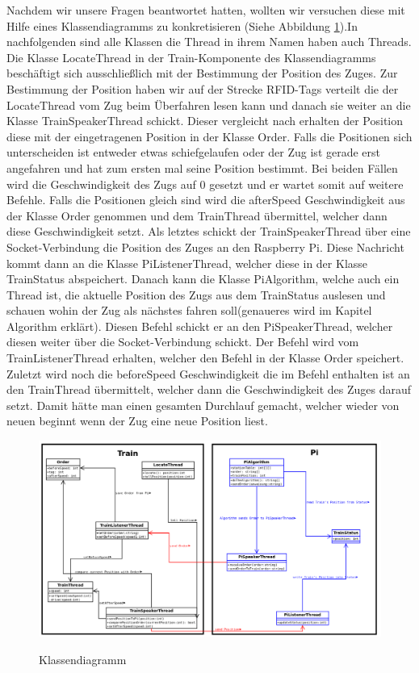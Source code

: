 Nachdem wir unsere Fragen beantwortet hatten, wollten wir versuchen diese mit Hilfe eines Klassendiagramms zu konkretisieren (Siehe Abbildung \ref{pic:ClassDiagram}).In nachfolgenden sind alle Klassen die Thread in ihrem Namen haben auch Threads. Die Klasse LocateThread in der Train-Komponente des Klassendiagramms beschäftigt sich ausschließlich mit der Bestimmung der Position des Zuges. Zur Bestimmung der Position  haben wir auf der Strecke RFID-Tags verteilt die der LocateThread vom Zug beim Überfahren lesen kann und danach sie weiter an die Klasse TrainSpeakerThread schickt. Dieser vergleicht nach erhalten der Position diese mit der eingetragenen Position in der Klasse Order. Falls die Positionen sich unterscheiden ist entweder etwas schiefgelaufen oder der Zug ist gerade erst angefahren und hat zum ersten mal seine Position bestimmt. Bei beiden Fällen wird die Geschwindigkeit des Zugs auf 0 gesetzt und er wartet somit auf weitere Befehle. Falls die Positionen gleich sind wird die afterSpeed Geschwindigkeit aus der Klasse Order genommen und dem TrainThread übermittel, welcher dann diese Geschwindigkeit setzt. Als letztes schickt der TrainSpeakerThread über eine Socket-Verbindung die Position des Zuges an den Raspberry Pi. Diese Nachricht kommt dann an die Klasse PiListenerThread, welcher diese in der Klasse TrainStatus abspeichert. Danach kann die Klasse PiAlgorithm, welche auch ein Thread ist, die aktuelle Position des Zugs aus dem TrainStatus auslesen und schauen wohin der Zug als nächstes fahren soll(genaueres wird im Kapitel Algorithm erklärt). Diesen Befehl schickt er an den PiSpeakerThread, welcher diesen weiter über die Socket-Verbindung schickt. Der Befehl wird vom TrainListenerThread erhalten, welcher den Befehl in der Klasse Order speichert. Zuletzt wird noch die beforeSpeed Geschwindigkeit die im Befehl enthalten ist an den TrainThread übermittelt, welcher dann die Geschwindigkeit des Zuges darauf setzt. Damit hätte man einen gesamten Durchlauf gemacht, welcher wieder von neuen beginnt wenn der Zug eine neue Position liest.  


\begin{figure}[H]	
\caption{Klassendiagramm}
\includegraphics[width=2\textwidth, width=465pt]{content/images/ClassDiagram.png}
\label{pic:ClassDiagram}
\end{figure}



